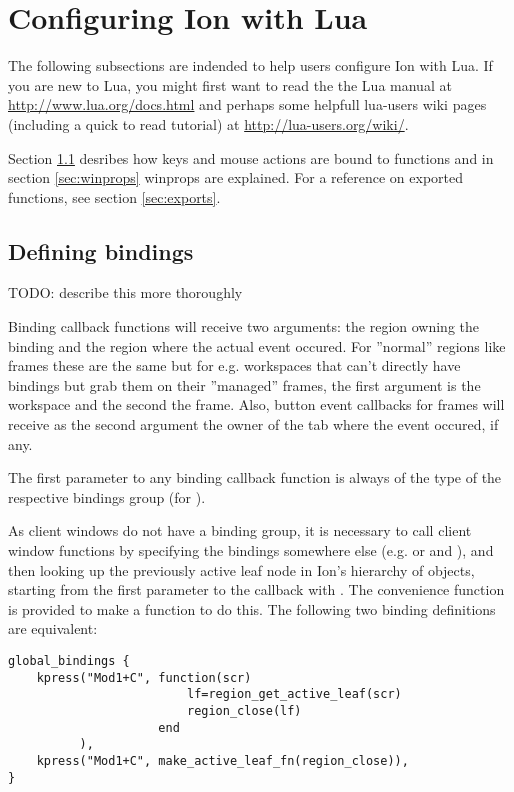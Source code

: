
\section{Configuring Ion with Lua}

The following subsections are indended to help users configure Ion
with Lua. If you are new to Lua, you might first want to read the
the Lua manual at \url{http://www.lua.org/docs.html} and perhaps
some helpfull lua-users wiki pages (including a quick to read tutorial)
at \url{http://lua-users.org/wiki/}.

Section \ref{sec:bindings} desribes how keys and mouse
actions are bound to functions and in section \ref{sec:winprops}
winprops are explained. For a reference on exported functions, see
section \ref{sec:exports}.

\subsection{Defining bindings}
\label{sec:bindings}

TODO: describe this more thoroughly

Binding callback functions will receive two arguments: the region
owning the binding and the region where the actual event occured.
For ''normal'' regions like frames these are the same but for e.g.
workspaces that can't directly have bindings but grab them on their
''managed'' frames, the first argument is the workspace and the second
the frame. Also, button event callbacks for frames will receive as the
second argument the owner of the tab where the event occured, if any.

The first parameter to any binding callback function is always of the
type of the respective bindings group (for 
).

As client windows do not have a binding group, it is necessary to
call client window functions by specifying the bindings somewhere
else (e.g.  or 
and ), and then looking up the previously
active leaf node in Ion's hierarchy of objects, starting from the
first parameter to the callback with
%
.
The convenience function  is provided to
make a function to do this. The following two binding definitions are
equivalent:

\begin{verbatim}
global_bindings {
    kpress("Mod1+C", function(scr)
                         lf=region_get_active_leaf(scr)
                         region_close(lf)
                     end
          ),
    kpress("Mod1+C", make_active_leaf_fn(region_close)),
}
\end{verbatim}

